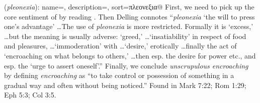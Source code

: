 \item[Unscrupulous encroaching,]

(\textit{pleonexia}):
{
    name=,
    description={},
    sort=πλεονεξια@
}
First, we need to pick up the core sentiment of  by reading . Then  Delling connotes ``\emph{pleonexia} `the will to press one's advantage' \ldots The use of \emph{pleonexia} is more restricted. Formally it is `excess,' \ldots but the meaning is usually adverse: `greed,' \ldots `insatiability' in respect of food and pleasures, \ldots `immoderation' with \ldots `desire,' erotically \ldots finally the act of `encroaching on what belongs to others,' \ldots then esp. the desire for power etc., and esp. the `urge to assert oneself'.''
Finally, we conclude \emph{unscrupulous encroaching} by defining \emph{encroaching} as ``to take control or possession of something in a gradual way and often without being noticed.''
Found in Mark 7:22; Rom 1:29; Eph 5:3; Col 3:5.
